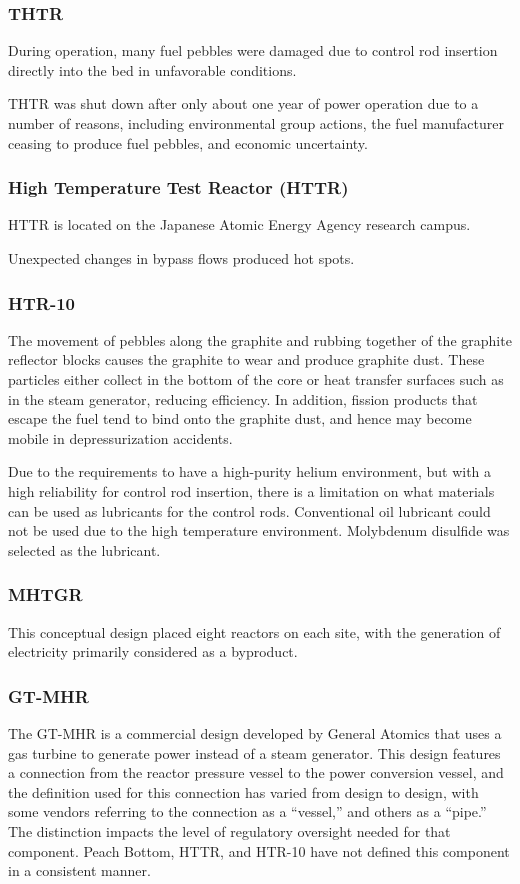 \documentclass[10pt]{article}
\numberwithin{equation}{section} %
\begin{document}
\subsubsection{THTR}
During operation, many fuel pebbles were damaged due to control rod insertion directly into the bed in unfavorable conditions.

THTR was shut down after only about one year of power operation due to a number of reasons, including environmental group actions, the fuel manufacturer ceasing to produce fuel pebbles, and economic uncertainty.

\subsubsection{High Temperature Test Reactor (HTTR)}
HTTR is located on the Japanese Atomic Energy Agency research campus. 

Unexpected changes in bypass flows produced hot spots.

\subsubsection{HTR-10}\cite{HTGRLessonsLearned}


The movement of pebbles along the graphite and rubbing together of the graphite reflector blocks causes the graphite to wear and produce graphite dust. These particles either collect in the bottom of the core or heat transfer surfaces such as in the steam generator, reducing efficiency. In addition, fission products that escape the fuel tend to bind onto the graphite dust, and hence may become mobile in depressurization accidents.

Due to the requirements to have a high-purity helium environment, but with a high reliability for control rod insertion, there is a limitation on what materials can be used as lubricants for the control rods. Conventional oil lubricant could not be used due to the high temperature environment. Molybdenum disulfide was selected as the lubricant.
 
\subsubsection{MHTGR}\cite{HTGRLessonsLearned}
This conceptual design placed eight reactors on each site, with the generation of electricity primarily considered as a byproduct.

\subsubsection{GT-MHR}\cite{HTGRLessonsLearned}
The GT-MHR is a commercial design developed by General Atomics that uses a gas turbine to generate power instead of a steam generator. This design features a connection from the reactor pressure vessel to the power conversion vessel, and the definition used for this connection has varied from design to design, with some vendors referring to the connection as a ``vessel,'' and others as a ``pipe.'' The distinction impacts the level of regulatory oversight needed for that component. Peach Bottom, HTTR, and HTR-10 have not defined this component in a consistent manner.
\end{document}
